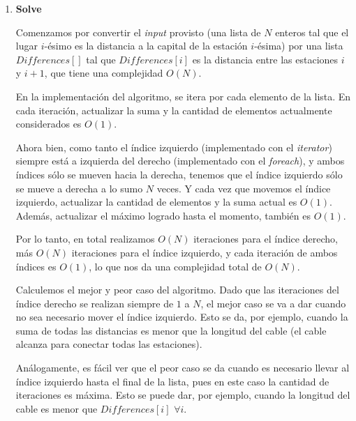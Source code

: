 \vspace*{1em}
\begin{enumerate}

\item\textbf{Solve}
\par 
Comenzamos por convertir el \textit{input} provisto (una lista de $N$ enteros tal que el lugar $i$-\'esimo es la distancia a la capital de la estaci\'on $i$-\'esima) por una lista $Differences[]$ tal que $Differences[i]$ es la distancia entre las estaciones $i$ y $i+1$, que tiene una complejidad $O(N)$.

En la implementaci\'on del algoritmo, se itera por cada elemento de la lista. En cada iteraci\'on, actualizar la suma y la cantidad de elementos actualmente considerados es $O(1)$.

Ahora bien, como tanto el \'indice izquierdo (implementado con el \textit{iterator}) siempre est\'a a izquierda del derecho (implementado con el \textit{foreach}), y ambos \'indices s\'olo se mueven hacia la derecha, tenemos que el \'indice izquierdo s\'olo se mueve a derecha a lo sumo $N$ veces. Y cada vez que movemos el \'indice izquierdo, actualizar la cantidad de elementos y la suma actual es $O(1)$. Adem\'as, actualizar el m\'aximo logrado hasta el momento, tambi\'en es $O(1)$.

Por lo tanto, en total realizamos $O(N)$ iteraciones para el \'indice derecho, m\'as $O(N)$ iteraciones para el \'indice izquierdo, y cada iteraci\'on de ambos \'indices es $O(1)$, lo que nos da una complejidad total de $O(N)$.

Calculemos el mejor y peor caso del algoritmo. Dado que las iteraciones del \'indice derecho se realizan siempre de $1$ a $N$, el mejor caso se va a dar cuando no sea necesario mover el \'indice izquierdo. Esto se da, por ejemplo, cuando la suma de todas las distancias es menor que la longitud del cable (el cable alcanza para conectar todas las estaciones).

An\'alogamente, es f\'acil ver que el peor caso se da cuando es necesario llevar al \'indice izquierdo hasta el final de la lista, pues en este caso la cantidad de iteraciones es m\'axima. Esto se puede dar, por ejemplo, cuando la longitud del cable es menor que $Differences[i]	$ $\forall i$. 

\end{enumerate}
